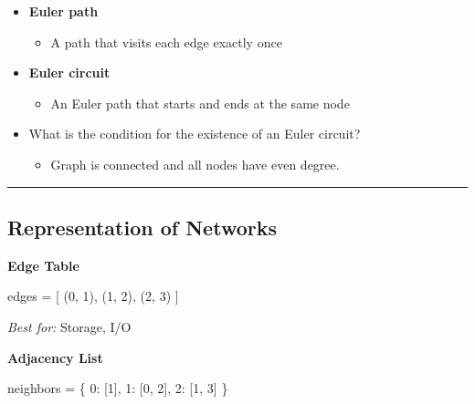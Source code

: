 \documentclass[
  letterpaper,
  DIV=11,
  numbers=noendperiod,
  oneside]{scrartcl}
\newenvironment{Shaded}{}{}
\newcommand{\DecValTok}[1]{\textcolor[rgb]{0.00,0.36,0.77}{#1}}
\newcommand{\NormalTok}[1]{\textcolor[rgb]{0.14,0.16,0.18}{#1}}
\newcommand{\OperatorTok}[1]{\textcolor[rgb]{0.14,0.16,0.18}{#1}}
\providecommand{\tightlist}{%
  \setlength{\itemsep}{0pt}\setlength{\parskip}{0pt}}
\begin{document}
\begin{itemize}
\tightlist
\item
  \textbf{Euler path}

  \begin{itemize}
  \tightlist
  \item
    A path that visits each edge exactly once
  \end{itemize}
\item
  \textbf{Euler circuit}

  \begin{itemize}
  \tightlist
  \item
    An Euler path that starts and ends at the same node
  \end{itemize}
\item
  {What is the condition for the existence of an Euler circuit?}

  \begin{itemize}
  \tightlist
  \item
    {Graph is connected and all nodes have even degree.}
  \end{itemize}
\end{itemize}

\begin{center}\rule{0.5\linewidth}{0.5pt}\end{center}

\subsection{Representation of
Networks}\label{representation-of-networks}

\textbf{Edge Table}

\begin{Shaded}
\begin{Highlighting}[]
\NormalTok{edges }\OperatorTok{=}\NormalTok{ [}
\NormalTok{    (}\DecValTok{0}\NormalTok{, }\DecValTok{1}\NormalTok{),}
\NormalTok{    (}\DecValTok{1}\NormalTok{, }\DecValTok{2}\NormalTok{),}
\NormalTok{    (}\DecValTok{2}\NormalTok{, }\DecValTok{3}\NormalTok{)}
\NormalTok{]}
\end{Highlighting}
\end{Shaded}

\emph{Best for:} Storage, I/O

\textbf{Adjacency List}

\begin{Shaded}
\begin{Highlighting}[]
\NormalTok{neighbors }\OperatorTok{=}\NormalTok{ \{}
    \DecValTok{0}\NormalTok{: [}\DecValTok{1}\NormalTok{],}
    \DecValTok{1}\NormalTok{: [}\DecValTok{0}\NormalTok{, }\DecValTok{2}\NormalTok{],}
    \DecValTok{2}\NormalTok{: [}\DecValTok{1}\NormalTok{, }\DecValTok{3}\NormalTok{]}
\NormalTok{\}}
\end{Highlighting}
\end{Shaded}
\end{document}
